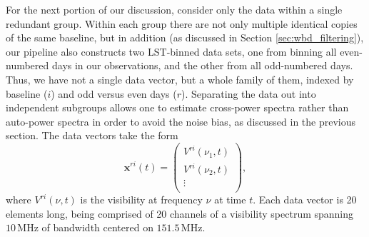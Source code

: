 \documentclass[twocolumn,numberedappendix]{emulateapj} \shorttitle{PSA64}
\begin{document}
For the next portion of our discussion, consider only the data within a single redundant group. Within each group there are not only multiple identical copies of the same baseline, but in addition (as discussed in
Section \ref{sec:wbd_filtering}), our pipeline also constructs two LST-binned data sets, one from binning all even-numbered days in our observations, and the other from all odd-numbered days. Thus, 
we have not a single data vector, but a whole family of them, indexed by baseline ($i$) and odd
versus even days ($r$). Separating the data out into independent subgroups allows one to estimate
cross-power spectra rather than auto-power spectra in order to avoid the noise bias, as discussed in the previous section. The data vectors take the form
\begin{equation}
\label{eqn:xvectdef}
\mathbf{x}^{ri}(t) = \left( \begin{array}{c}
V^{ri} (\nu_1, t) \\
V^{ri} (\nu_2, t) \\
\vdots \\
\end{array}
\right), 
\end{equation}
where $V^{ri} (\nu, t)$ is the visibility at frequency $\nu$ at time $t$. Each data vector is 
20 elements long, being comprised of 20 channels of a visibility spectrum spanning $10\,\textrm{MHz}$ of bandwidth centered on $151.5\,\textrm{MHz}$.
%
\end{document}
